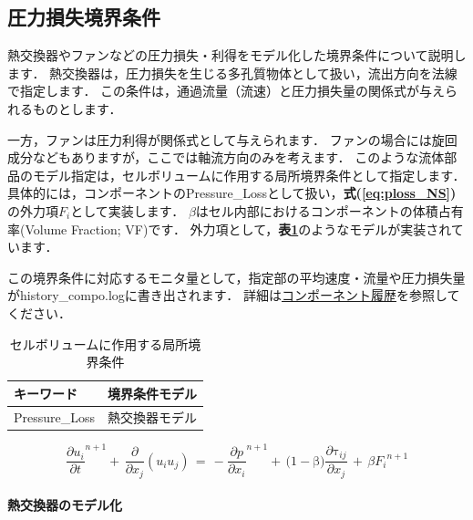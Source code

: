 \subsection{圧力損失境界条件}
熱交換器やファンなどの圧力損失・利得をモデル化した境界条件について説明します．
熱交換器は，圧力損失を生じる多孔質物体として扱い，流出方向を法線で指定します．
この条件は，通過流量（流速）と圧力損失量の関係式が与えられるものとします．

一方，ファンは圧力利得が関係式として与えられます．
ファンの場合には旋回成分などもありますが，ここでは軸流方向のみを考えます．
このような流体部品のモデル指定は，セルボリュームに作用する局所境界条件として指定します．
具体的には，コンポーネントのPressure\_Lossとして扱い，\textbf{式(\ref{eq:ploss_NS})}の外力項$F_{i}$として実装します．
$\beta$はセル内部におけるコンポーネントの体積占有率(Volume Fraction; VF)です．
外力項として，\textbf{表\ref{tbl:ploss_model}}のようなモデルが実装されています．

この境界条件に対応するモニタ量として，指定部の平均速度・流量や圧力損失量がhistory\_compo.logに書き出されます．
詳細は\hyperlink{tgt:history_compo}{コンポーネント履歴}を参照してください．

\begin{table}[htdp]
\caption{セルボリュームに作用する局所境界条件}
\begin{center}
\small
\begin{tabular}{ll} \toprule
キーワード & 境界条件モデル \\ \midrule
Pressure\_Loss & 熱交換器モデル \\ 
\bottomrule
\end{tabular}
\end{center}
\label{tbl:ploss_model}
\end{table}

\begin{equation}
{\frac{\partial{u}_{i}}{\partial{t}}}^{{n}{+}{1}}{+}\,\frac{\partial}{\partial{x}_{j}}\left({{u}_{i}{u}_{j}}\right)
\,{=}\,
{-}{\frac{\partial{p}}{\partial{x}_{i}}}^{{n}{+}{1}}{+}\,{(}{1}{-}\mathrm{\beta}{)}\frac{\partial{\mathrm{\tau}}_{ij}}{\partial{x}_{j}}\,{+}\,\beta {F_{i}}^{n+1}
\label{eq:ploss_NS}
\end{equation}

%
\paragraph{熱交換器のモデル化}

